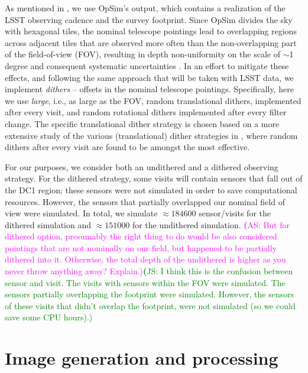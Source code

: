 \documentclass[twocolumn]{aastex62}
\newcommand{\as}[1]{{\textcolor{magenta}{{\textbf (AS: #1)}}}}
\newcommand{\js}[1]{{\textcolor{green}{{\textbf (JS: #1)}}}}
\begin{document}
As mentioned in , we use OpSim's output, which contains a realization of the LSST observing cadence and the survey footprint. Since OpSim divides the sky with hexagonal tiles, the nominal telescope pointings lead to overlapping regions across adjacent tiles that are observed more often than the non-overlapping part of the field-of-view (FOV), resulting in depth non-uniformity on the scale of $\sim$1 degree and consequent systematic uncertainties \citep{2016ApJ...829...50A}. In an effort to mitigate these effects, and following the same approach that will be taken with LSST data, we implement \textit{dithers} -- offsets in the nominal telescope pointings. Specifically, here we use \textit{large}, i.e., as large as the FOV, random translational dithers, implemented after every visit, and random rotational dithers implemented after every filter change. The specific translational dither strategy is chosen based on a more extensive study of the various (translational) dither strategies in \citet{2016ApJ...829...50A}, where random dithers after every visit are found to be amongst the most effective.

For our purposes, we consider both an undithered and a dithered observing strategy. For the dithered strategy, some visits will contain sensors that fall out of the DC1 region; these sensors were not simulated in order to save computational resources. However, the sensors that partially overlapped our nominal field of view were simulated. In total, we simulate $\approx 184600$ sensor/visits for the dithered simulation and $\approx 151000$ for the undithered simulation.
\as{But for dithered option, presumably the right thing to do would be also considered pointings that are not nominally on our field, but happened to be partially dithered into it. Otherwise, the total depth of the undithered is higher as you never throw anything away? Explain.}\js{I think this is the confusion between sensor and visit. The visits with sensors within the FOV were simulated. The sensors partially overlapping the footprint were simulated. However, the sensors of these visits that didn't overlap the footprint, were not simulated (so we could save some CPU hours).}



\section{Image generation and processing}
\label{sec:image_generation_pipeline}
\end{document}
